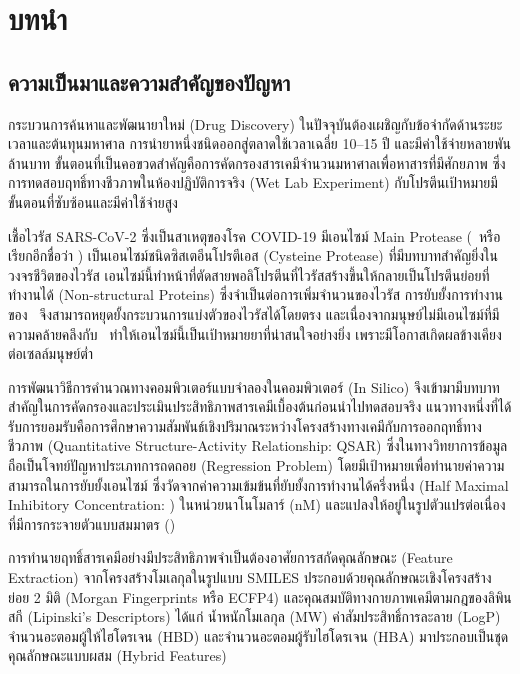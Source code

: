 \chapter{บทนำ}

\section{ความเป็นมาและความสำคัญของปัญหา}

กระบวนการค้นหาและพัฒนายาใหม่ (Drug Discovery) ในปัจจุบันต้องเผชิญกับข้อจำกัดด้านระยะเวลาและต้นทุนมหาศาล การนำยาหนึ่งชนิดออกสู่ตลาดใช้เวลาเฉลี่ย 10--15 ปี และมีค่าใช้จ่ายหลายพันล้านบาท ขั้นตอนที่เป็นคอขวดสำคัญคือการคัดกรองสารเคมีจำนวนมหาศาลเพื่อหาสารที่มีศักยภาพ ซึ่งการทดสอบฤทธิ์ทางชีวภาพในห้องปฏิบัติการจริง (Wet Lab Experiment) กับโปรตีนเป้าหมายมีขั้นตอนที่ซับซ้อนและมีค่าใช้จ่ายสูง

เชื้อไวรัส SARS-CoV-2 ซึ่งเป็นสาเหตุของโรค COVID-19 มีเอนไซม์ Main Protease (\Mpro\ หรือเรียกอีกชื่อว่า \CLpro) เป็นเอนไซม์ชนิดซิสเตอีนโปรตีเอส (Cysteine Protease) ที่มีบทบาทสำคัญยิ่งในวงจรชีวิตของไวรัส เอนไซม์นี้ทำหน้าที่ตัดสายพอลิโปรตีนที่ไวรัสสร้างขึ้นให้กลายเป็นโปรตีนย่อยที่ทำงานได้ (Non-structural Proteins) ซึ่งจำเป็นต่อการเพิ่มจำนวนของไวรัส การยับยั้งการทำงานของ \Mpro\ จึงสามารถหยุดยั้งกระบวนการแบ่งตัวของไวรัสได้โดยตรง และเนื่องจากมนุษย์ไม่มีเอนไซม์ที่มีความคล้ายคลึงกับ \Mpro\ ทำให้เอนไซม์นี้เป็นเป้าหมายยาที่น่าสนใจอย่างยิ่ง เพราะมีโอกาสเกิดผลข้างเคียงต่อเซลล์มนุษย์ต่ำ

การพัฒนาวิธีการคำนวณทางคอมพิวเตอร์แบบจำลองในคอมพิวเตอร์ (In Silico) จึงเข้ามามีบทบาทสำคัญในการคัดกรองและประเมินประสิทธิภาพสารเคมีเบื้องต้นก่อนนำไปทดสอบจริง แนวทางหนึ่งที่ได้รับการยอมรับคือการศึกษาความสัมพันธ์เชิงปริมาณระหว่างโครงสร้างทางเคมีกับการออกฤทธิ์ทางชีวภาพ (Quantitative Structure-Activity Relationship: QSAR) ซึ่งในทางวิทยาการข้อมูลถือเป็นโจทย์ปัญหาประเภทการถดถอย (Regression Problem) โดยมีเป้าหมายเพื่อทำนายค่าความสามารถในการยับยั้งเอนไซม์ ซึ่งวัดจากค่าความเข้มข้นที่ยับยั้งการทำงานได้ครึ่งหนึ่ง (Half Maximal Inhibitory Concentration: \ICfifty) ในหน่วยนาโนโมลาร์ (nM) และแปลงให้อยู่ในรูปตัวแปรต่อเนื่องที่มีการกระจายตัวแบบสมมาตร (\pICfifty)

การทำนายฤทธิ์สารเคมีอย่างมีประสิทธิภาพจำเป็นต้องอาศัยการสกัดคุณลักษณะ (Feature Extraction) จากโครงสร้างโมเลกุลในรูปแบบ SMILES ประกอบด้วยคุณลักษณะเชิงโครงสร้างย่อย 2 มิติ (Morgan Fingerprints หรือ ECFP4) และคุณสมบัติทางกายภาพเคมีตามกฎของลิพินสกี (Lipinski's Descriptors) ได้แก่ น้ำหนักโมเลกุล (MW) ค่าสัมประสิทธิ์การละลาย (LogP) จำนวนอะตอมผู้ให้ไฮโดรเจน (HBD) และจำนวนอะตอมผู้รับไฮโดรเจน (HBA) มาประกอบเป็นชุดคุณลักษณะแบบผสม (Hybrid Features)

